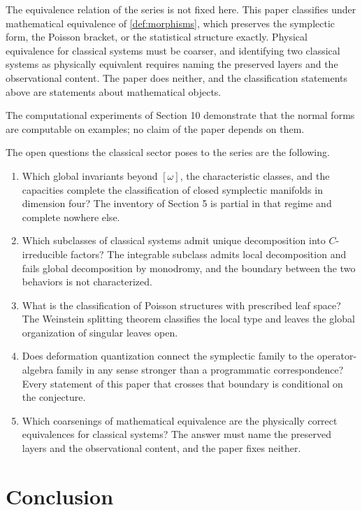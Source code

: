 \documentclass[11pt,letterpaper]{article}
\theoremstyle{definition}
\theoremstyle{remark}
\begin{document}
The equivalence relation of the series is not fixed here. This paper classifies under mathematical equivalence of \cref{def:morphisms}, which preserves the symplectic form, the Poisson bracket, or the statistical structure exactly. Physical equivalence for classical systems must be coarser, and identifying two classical systems as physically equivalent requires naming the preserved layers and the observational content. The paper does neither, and the classification statements above are statements about mathematical objects.

The computational experiments of Section 10 demonstrate that the normal forms are computable on examples; no claim of the paper depends on them.

The open questions the classical sector poses to the series are the following.

\begin{enumerate}
\item Which global invariants beyond $[\omega]$, the characteristic classes, and the capacities complete the classification of closed symplectic manifolds in dimension four? The inventory of Section 5 is partial in that regime and complete nowhere else.
\item Which subclasses of classical systems admit unique decomposition into $C$-irreducible factors? The integrable subclass admits local decomposition and fails global decomposition by monodromy, and the boundary between the two behaviors is not characterized.
\item What is the classification of Poisson structures with prescribed leaf space? The Weinstein splitting theorem classifies the local type and leaves the global organization of singular leaves open.
\item Does deformation quantization connect the symplectic family to the operator-algebra family in any sense stronger than a programmatic correspondence? Every statement of this paper that crosses that boundary is conditional on the conjecture.
\item Which coarsenings of mathematical equivalence are the physically correct equivalences for classical systems? The answer must name the preserved layers and the observational content, and the paper fixes neither.
\end{enumerate}

\section{Conclusion}
\end{document}
